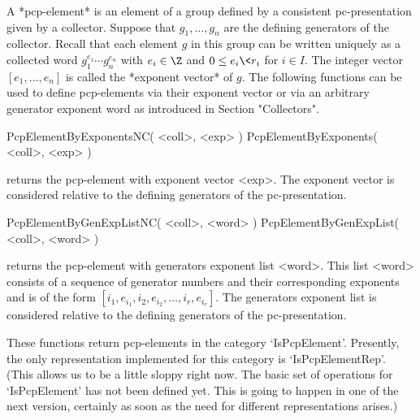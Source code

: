 


A *pcp-element* is an element of a group defined by a consistent
pc-presentation given by a collector. Suppose that $g_1, \ldots, g_n$
are the defining generators of the collector. Recall that each element
$g$ in this group can be written uniquely as a collected word $g_1^{e_1}
\cdots g_n^{e_n}$ with $e_i \in \Z$ and $0 \leq e_i \< r_i$ for $i \in
I$. The integer vector $[e_1, \ldots, e_n]$ is called the *exponent
vector* of $g$.  The following functions can be used to define
pcp-elements via their exponent vector or via an arbitrary generator
exponent word as introduced in Section "Collectors".

\>PcpElementByExponentsNC( <coll>, <exp> )
\>PcpElementByExponents( <coll>, <exp> )

returns the pcp-element with exponent vector <exp>. The exponent vector
is considered relative to the defining generators of the pc-presentation.

\>PcpElementByGenExpListNC( <coll>, <word> )
\>PcpElementByGenExpList( <coll>, <word> )

returns the pcp-element with generators exponent list <word>. This list
<word> consists of a sequence of generator numbers and their corresponding
exponents and is of the form $[i_1, e_{i_1}, i_2, e_{i_2}, \ldots, i_r, 
e_{i_r}]$. The 
generators exponent list is considered relative to the defining generators
of the pc-presentation. 

These functions return pcp-elements in the category `IsPcpElement'.
Presently,  the  only representation  implemented for this category
is `IsPcpElementRep'.  
(This allows us  to be a  little sloppy right now.  The basic  set of 
operations for  `IsPcpElement' has  not been defined yet.  This is 
going to happen in one of the next version, certainly as soon as the 
need for different representations arises.)

